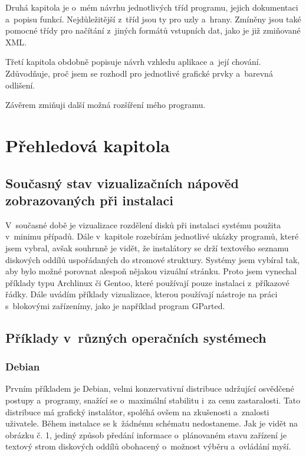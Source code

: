 \documentclass[color,table,oneside,nolot,nolof]{fithesis}
\begin{document}
	Druhá kapitola je o~mém návrhu jednotlivých tříd programu, jejich dokumentaci a~popisu funkcí. Nejdůležitější z~tříd jsou ty pro uzly a~hrany. Zmíněny jsou také pomocné třídy 
	pro načítání z~jiných formátů vstupních dat, jako je již zmiňované XML.

	Třetí kapitola obdobně popisuje návrh vzhledu aplikace a~její chování. Zdůvodňuje, proč jsem se rozhodl pro jednotlivé grafické prvky a~barevná odlišení.

	Závěrem zmiňuji další možná rozšíření mého programu. 

\chapter{Přehledová kapitola}
\section{Současný stav vizualizačních nápověd zobrazovaných při instalaci}

V~současné době je vizualizace rozdělení disků při instalaci systému použita v~minimu případů. Dále v~kapitole rozebírám jednotlivé ukázky programů, které jsem vybral, avšak souhrnně je vidět, 
že instalátory se drží textového seznamu diskových oddílů uspořádaných do stromové struktury. Systémy jsem vybíral tak, aby bylo možné porovnat alespoň nějakou vizuální stránku. Proto jsem vynechal
příklady typu Archlinux či Gentoo, které používají pouze instalaci z~příkazové řádky.  Dále uvádím příklady vizualizace, kterou používají nástroje na práci s~blokovými zařízenímy, jako je 
například program GParted.

\section{Příklady v~různých operačních systémech}

\subsection{Debian}

Prvním příkladem je Debian, velmi konzervativní distribuce udržující osvědčené postupy a~programy, snažící se o~maximální stabilitu i~za cenu zastaralosti. 
Tato distribuce má grafický instalátor, spoléhá ovšem na zkušenosti a~znalosti uživatele. Během instalace se k~žádnému schématu nedostaneme. Jak je vidět na obrázku č. 1, jediný způsob předání 
informace o~plánovaném stavu zařízení je textový strom diskových oddílů obohacený o~možnost výběru a~ovládání myší.
\end{document}
